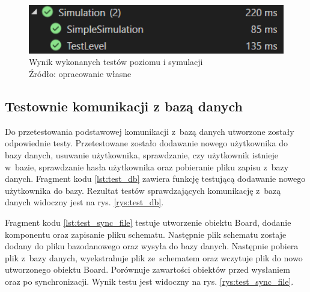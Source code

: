 \documentclass[12pt, a4paper]{article} %
\begin{document}


\begin{figure}[h]
	\centering
	\includegraphics[width=12cm]{images/test_level.png}
	\caption{Wynik wykonanych testów poziomu i symulacji\\ Źródło: opracowanie własne}
	\label{rys:test_sim}
\end{figure} 

\subsection{Testownie komunikacji z bazą danych}
\aka Do przetestowania podstawowej komunikacji z~bazą danych utworzone zostały odpowiednie testy. Przetestowane zostało dodawanie nowego użytkownika do bazy danych, usuwanie użytkownika, sprawdzanie, czy użytkownik istnieje w~bazie, sprawdzanie hasła użytkownika oraz pobieranie pliku zapisu z~bazy danych. Fragment kodu \ref{lst:test_db} zawiera funkcję testującą dodawanie nowego użytkownika do bazy. Rezultat testów sprawdzających komunikację z~bazą danych widoczny jest na rys. \ref{rys:test_db}.





\aka Fragment kodu \ref{lst:test_sync_file} testuje utworzenie obiektu Board, dodanie komponentu oraz zapisanie pliku schematu. Następnie plik schematu zostaje dodany do pliku bazodanowego oraz wysyła do bazy danych. Następnie pobiera plik z~bazy danych, wyekstrahuje plik ze~schematem oraz wczytuje plik do nowo utworzonego obiektu Board. Porównuje zawartości obiektów przed wysłaniem oraz po synchronizacji.
Wynik testu jest widoczny na rys. \ref{rys:test_sync_file}.
\end{document}
